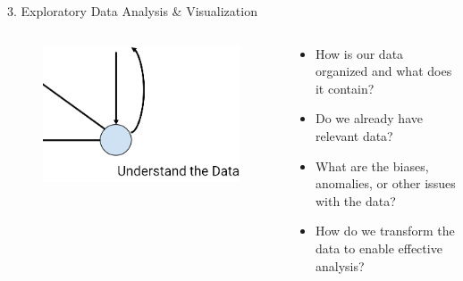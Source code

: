 \documentclass[aspectratio=169]{../latex_main/tntbeamer}  %
\begin{document}
    \begin{frame}{3. Exploratory Data Analysis & Visualization}
        \begin{columns}
            \begin{column}{.3\textwidth}
            \begin{figure}
                \includegraphics[scale=.45]{bild19}
                
            \end{figure}
            \end{column}
            \begin{column}{.4\textwidth}
            \begin{itemize}
                \item How is our data organized and what does it contain?
                \item Do we already have relevant data?
                \item What are the biases, anomalies, or other issues with the data?
                \item How do we transform the data to enable effective analysis?
            \end{itemize}
            \end{column}
  
        \end{columns}
    \end{frame}
\end{document}
